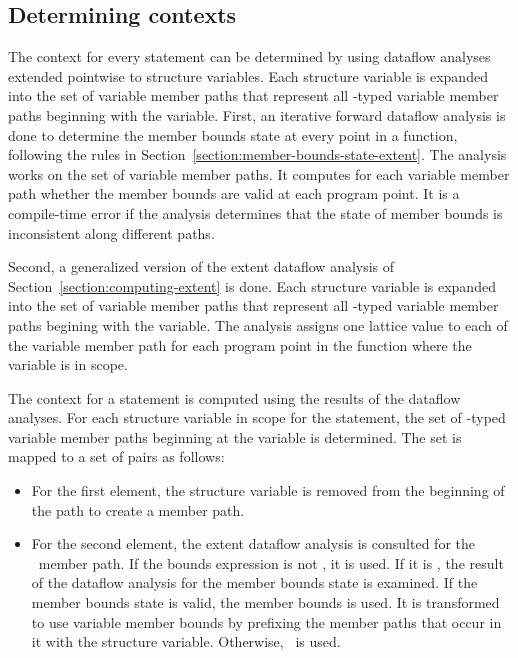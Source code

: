 \subsection{Determining contexts}

The context for every statement can be determined by using dataflow analyses extended
pointwise to structure variables.  Each structure variable is expanded into the set
of variable member paths that represent all \arrayptr-typed variable member paths beginning
with the variable.  First, an iterative forward dataflow analysis is done to determine the
member bounds state at every point in a function, following the rules in
Section~\ref{section:member-bounds-state-extent}.  The analysis works on the set of variable
member paths.   It computes for each variable member path whether the member bounds are valid 
at each program point.  It is a compile-time error if the analysis determines that the state of
member bounds is inconsistent along different paths.

Second, a generalized version of the extent dataflow analysis of Section~\ref{section:computing-extent}
is done.  Each structure variable is expanded into the set of variable
member paths that represent all \arrayptr-typed variable member paths begining with 
the variable.  The analysis assigns one lattice value to each of the variable member path for
each program point in the function where the variable is in scope.

The context for a statement is computed using the results of the dataflow analyses.
For each structure variable in scope for the statement, the set of \arrayptr-typed variable member paths 
beginning at the variable is determined.  The set is mapped to a set of pairs as follows:
\begin{itemize}
\item For the first element, the structure variable is removed from the beginning of the
path to create a member path.
\item For the second element, the extent dataflow analysis is consulted for the \arrayptr\ member path.
   If the bounds expression is not \boundsnone, it is used.   If it is \boundsnone, the result
   of the dataflow analysis for the member bounds state is examined. If the member bounds
   state is valid, the member bounds is used.  It is transformed to use variable member
   bounds by prefixing the member paths that occur in it with the structure variable.
   Otherwise, \boundsnone\ is used.
\end{itemize}

